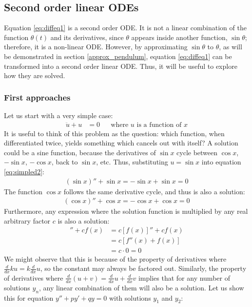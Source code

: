 \documentclass[12pt, a4paper, titlepage]{article}
\theoremstyle{definition}
\numberwithin{equation}{section}
\theoremstyle{definition}
\theoremstyle{definition}
\begin{document}
\subsection{Second order linear ODEs}
Equation \eqref{eq:diffeq1} is a second order ODE. It is not a linear combination of the function $\theta(t)$ and its derivatives, since $\theta$ appears inside another function, $\sin\theta$; therefore, it is a non-linear ODE. However, by approximating $\sin\theta$ to $\theta$, as will be demonstrated in section \ref{approx_pendulum}, equation \eqref{eq:diffeq1} can be transformed into a second order linear ODE. Thus, it will be useful to explore how they are solved.

\subsubsection{First approaches}\label{firstapproaches}
Let us start with a very simple case:
\begin{align}
\ddot{u}+u&=0&&\text{where $u$ is a function of $x$}\label{eq:simpled2}
\end{align}
It is useful to think of this problem as the question: which function, when differentiated twice, yields something which cancels out with itself? A solution could be a sine function, because the derivatives of $\sin x$ cycle between $\cos x$, $-\sin x$, $-\cos x$, back to $\sin x$, etc. Thus, substituting $u=\sin x$ into equation \eqref{eq:simpled2}:
\begin{align}
(\sin x)''+\sin x=-\sin x+\sin x=0
\end{align}
The function $\cos x$ follows the same derivative cycle, and thus is also a solution:
\begin{align}
(\cos x)''+\cos x=-\cos x+\cos x=0
\end{align}
Furthermore, any expression where the solution function is multiplied by any real arbitrary factor $c$ is also a solution:
\begin{align}
[cf(x)]''+cf(x)&=c[f(x)]''+cf(x)\\
&=c[f''(x)+f(x)]\\
&=c\cdot 0=0
\end{align}
We might observe that this is because of the property of derivatives where $\frac{d}{dx}ku=k\frac{d}{dx}u$, so the constant may always be factored out. Similarly, the property of derivatives where $\frac{d}{dx}(u+v)=\frac{d}{dx}u+\frac{d}{dx}v$ implies that for any number of solutions $y_n$, any linear combination of them will also be a solution. \parencite{mse} Let us show this for equation $y''+py'+qy=0$ with solutions $y_1$ and $y_2$:
\end{document}
